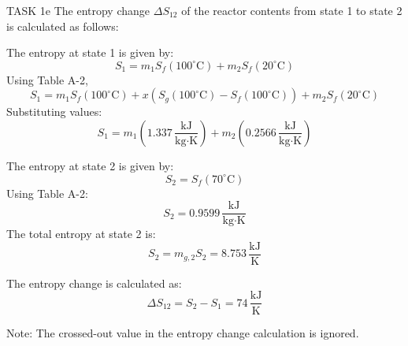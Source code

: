 TASK 1e  
The entropy change \( \Delta S_{12} \) of the reactor contents from state 1 to state 2 is calculated as follows:

The entropy at state 1 is given by:  
\[
S_1 = m_1 S_f(100^\circ\text{C}) + m_2 S_f(20^\circ\text{C})
\]  
Using Table A-2,  
\[
S_1 = m_1 S_f(100^\circ\text{C}) + x(S_g(100^\circ\text{C}) - S_f(100^\circ\text{C})) + m_2 S_f(20^\circ\text{C})
\]  
Substituting values:  
\[
S_1 = m_1 (1.337 \, \frac{\text{kJ}}{\text{kg·K}}) + m_2 (0.2566 \, \frac{\text{kJ}}{\text{kg·K}})
\]  

The entropy at state 2 is given by:  
\[
S_2 = S_f(70^\circ\text{C})
\]  
Using Table A-2:  
\[
S_2 = 0.9599 \, \frac{\text{kJ}}{\text{kg·K}}
\]  
The total entropy at state 2 is:  
\[
S_2 = m_{g,2} S_2 = 8.753 \, \frac{\text{kJ}}{\text{K}}
\]  

The entropy change is calculated as:  
\[
\Delta S_{12} = S_2 - S_1 = 74 \, \frac{\text{kJ}}{\text{K}}
\]  

Note: The crossed-out value in the entropy change calculation is ignored.